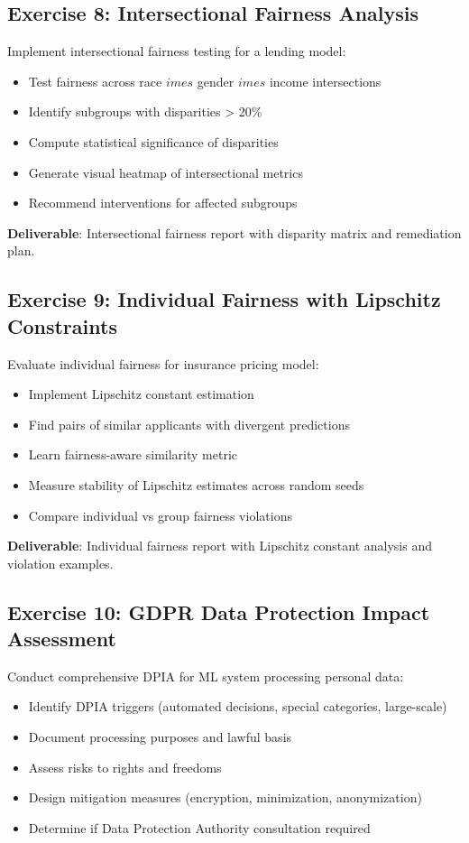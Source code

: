 \subsection{Exercise 8: Intersectional Fairness Analysis}

Implement intersectional fairness testing for a lending model:
\begin{itemize}
    \item Test fairness across race $	imes$ gender $	imes$ income intersections
    \item Identify subgroups with disparities > 20\%
    \item Compute statistical significance of disparities
    \item Generate visual heatmap of intersectional metrics
    \item Recommend interventions for affected subgroups
\end{itemize}

\textbf{Deliverable}: Intersectional fairness report with disparity matrix and remediation plan.

\subsection{Exercise 9: Individual Fairness with Lipschitz Constraints}

Evaluate individual fairness for insurance pricing model:
\begin{itemize}
    \item Implement Lipschitz constant estimation
    \item Find pairs of similar applicants with divergent predictions
    \item Learn fairness-aware similarity metric
    \item Measure stability of Lipschitz estimates across random seeds
    \item Compare individual vs group fairness violations
\end{itemize}

\textbf{Deliverable}: Individual fairness report with Lipschitz constant analysis and violation examples.

\subsection{Exercise 10: GDPR Data Protection Impact Assessment}

Conduct comprehensive DPIA for ML system processing personal data:
\begin{itemize}
    \item Identify DPIA triggers (automated decisions, special categories, large-scale)
    \item Document processing purposes and lawful basis
    \item Assess risks to rights and freedoms
    \item Design mitigation measures (encryption, minimization, anonymization)
    \item Determine if Data Protection Authority consultation required
\end{itemize}

